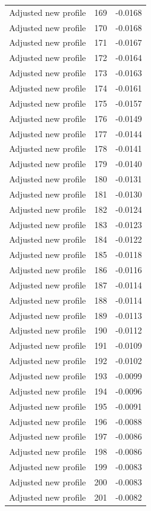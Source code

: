 \begin{table}[htbp]
\begin{tabular}{lll}
Adjusted new profile & 169 & -0.0168 \\
Adjusted new profile & 170 & -0.0168 \\
Adjusted new profile & 171 & -0.0167 \\
Adjusted new profile & 172 & -0.0164 \\
Adjusted new profile & 173 & -0.0163 \\
Adjusted new profile & 174 & -0.0161 \\
Adjusted new profile & 175 & -0.0157 \\
Adjusted new profile & 176 & -0.0149 \\
Adjusted new profile & 177 & -0.0144 \\
Adjusted new profile & 178 & -0.0141 \\
Adjusted new profile & 179 & -0.0140 \\
Adjusted new profile & 180 & -0.0131 \\
Adjusted new profile & 181 & -0.0130 \\
Adjusted new profile & 182 & -0.0124 \\
Adjusted new profile & 183 & -0.0123 \\
Adjusted new profile & 184 & -0.0122 \\
Adjusted new profile & 185 & -0.0118 \\
Adjusted new profile & 186 & -0.0116 \\
Adjusted new profile & 187 & -0.0114 \\
Adjusted new profile & 188 & -0.0114 \\
Adjusted new profile & 189 & -0.0113 \\
Adjusted new profile & 190 & -0.0112 \\
Adjusted new profile & 191 & -0.0109 \\
Adjusted new profile & 192 & -0.0102 \\
Adjusted new profile & 193 & -0.0099 \\
Adjusted new profile & 194 & -0.0096 \\
Adjusted new profile & 195 & -0.0091 \\
Adjusted new profile & 196 & -0.0088 \\
Adjusted new profile & 197 & -0.0086 \\
Adjusted new profile & 198 & -0.0086 \\
Adjusted new profile & 199 & -0.0083 \\
Adjusted new profile & 200 & -0.0083 \\
Adjusted new profile & 201 & -0.0082 \\

\end{tabular}
\end{table}
